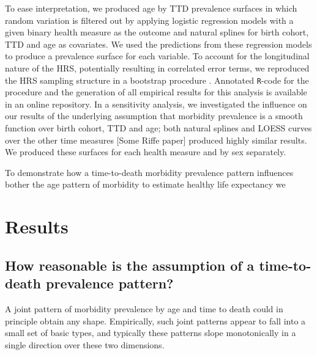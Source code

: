 \documentclass[11pt,oneside,a4paper]{article} %
\begin{document}
To ease interpretation, we produced age by TTD prevalence surfaces in which random variation is filtered out by applying logistic regression models with a given binary health measure as the outcome and natural splines for birth cohort, TTD and age as covariates. We used the predictions from these regression models to produce a prevalence surface for each variable. To account for the longitudinal nature of the HRS, potentially resulting in correlated error terms, we reproduced the HRS sampling structure in a bootstrap procedure \citep{efron1994introduction}. Annotated \texttt{R}-code for the procedure and the generation of all empirical results for this analysis is available in an online repository. In a sensitivity analysis, we investigated the influence on our results of the underlying assumption that morbidity prevalence is a smooth function over birth cohort, TTD and age; both natural splines and LOESS curves over the other time measures [Some Riffe paper] produced highly similar results. We produced these surfaces for each health measure and by sex separately.
% 


To demonstrate how a time-to-death morbidity prevalence pattern influences bother the age pattern of morbidity to estimate healthy life expectancy we 





\section{Results}
\subsection{How reasonable is the assumption of a time-to-death prevalence pattern?}
\label{sec:ttdok}
A joint pattern of morbidity prevalence by age and time to death could in principle obtain any shape. Empirically, such joint patterns appear to fall into a small set of basic types, and typically these patterns slope monotonically in a single direction over these two dimensions.
\end{document}
